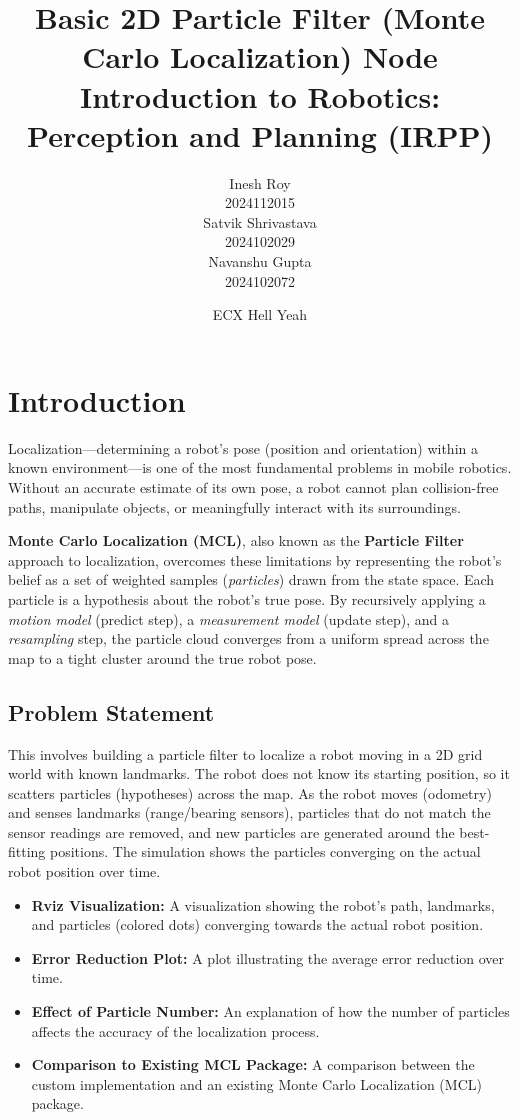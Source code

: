 \documentclass[12pt, a4paper]{article}
\title{%
  \textbf{Basic 2D Particle Filter (Monte Carlo Localization) Node} \\[6pt]
  \large Introduction to Robotics: Perception and Planning (IRPP) 
}
\author{
  Inesh Roy \\ 2024112015 \\
  Satvik Shrivastava \\ 2024102029 \\
  Navanshu Gupta \\ 2024102072 \\
}
\date{ECX Hell Yeah}
\begin{document}
\maketitle
\thispagestyle{empty}
\newpage
\tableofcontents
\newpage

\section{Introduction}

Localization---determining a robot's pose (position and orientation) within a known environment---is one of the most fundamental problems in mobile robotics.
Without an accurate estimate of its own pose, a robot cannot plan collision-free paths, manipulate objects, or meaningfully interact with its surroundings.

\textbf{Monte Carlo Localization (MCL)}, also known as the \textbf{Particle Filter} approach to localization, overcomes these limitations by representing the robot's belief as a set of weighted samples (\textit{particles}) drawn from the state space.  Each particle is a hypothesis about the robot's true pose.  By recursively applying a \textit{motion model} (predict step), a \textit{measurement model} (update step), and a \textit{resampling} step, the particle cloud converges from a uniform spread across the map to a tight cluster around the true robot pose.

\subsection{Problem Statement}
This involves building a particle filter to localize a robot moving in a 2D grid world with known landmarks. The robot does not know its starting position, so it scatters particles (hypotheses) across the map. As the robot moves (odometry) and senses landmarks (range/bearing sensors), particles that do not match the sensor readings are removed, and new particles are generated around the best-fitting positions. The simulation shows the particles converging on the actual robot position over time.

\begin{itemize}
    \item \textbf{Rviz Visualization:} A visualization showing the robot's path, landmarks, and particles (colored dots) converging towards the actual robot position.
    \item \textbf{Error Reduction Plot:} A plot illustrating the average error reduction over time.
    \item \textbf{Effect of Particle Number:} An explanation of how the number of particles affects the accuracy of the localization process.
    \item \textbf{Comparison to Existing MCL Package:} A comparison between the custom implementation and an existing Monte Carlo Localization (MCL) package.
\end{itemize}
\end{document}
